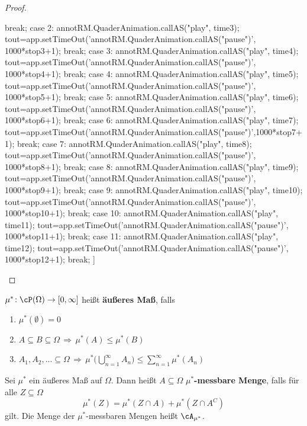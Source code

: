 \begin{proof}
\begin{center}
{{				break;
				case 2:
				annotRM.QuaderAnimation.callAS("play", time3);
				tout=app.setTimeOut('annotRM.QuaderAnimation.callAS("pause")', 1000*stop3+1);
				break;
				case 3:
				annotRM.QuaderAnimation.callAS("play", time4);
				tout=app.setTimeOut('annotRM.QuaderAnimation.callAS("pause")', 1000*stop4+1);
				break;
				case 4:
				annotRM.QuaderAnimation.callAS("play", time5);
				tout=app.setTimeOut('annotRM.QuaderAnimation.callAS("pause")', 1000*stop5+1);
				break;
				case 5:
				annotRM.QuaderAnimation.callAS("play", time6);
				tout=app.setTimeOut('annotRM.QuaderAnimation.callAS("pause")', 1000*stop6+1);
				break;
				case 6:
				annotRM.QuaderAnimation.callAS("play", time7);
				tout=app.setTimeOut('annotRM.QuaderAnimation.callAS("pause")',1000*stop7+1);
				break;
				case 7:
				annotRM.QuaderAnimation.callAS("play", time8);
				tout=app.setTimeOut('annotRM.QuaderAnimation.callAS("pause")', 1000*stop8+1);
				break;
				case 8:
				annotRM.QuaderAnimation.callAS("play", time9);
				tout=app.setTimeOut('annotRM.QuaderAnimation.callAS("pause")', 1000*stop9+1);
				break;
				case 9:
				annotRM.QuaderAnimation.callAS("play", time10);
				tout=app.setTimeOut('annotRM.QuaderAnimation.callAS("pause")', 1000*stop10+1);
				break;
				case 10:
				annotRM.QuaderAnimation.callAS("play", time11);
				tout=app.setTimeOut('annotRM.QuaderAnimation.callAS("pause")', 1000*stop11+1);
				break;
				case 11:
				annotRM.QuaderAnimation.callAS("play", time12);
				tout=app.setTimeOut('annotRM.QuaderAnimation.callAS("pause")', 1000*stop12+1);
				break;
		}}]{\fbox{\faStepForward
		}}
	\end{center}	

\end{proof}
\newpage
\begin{deff}
	$\mu^{*} \! : \cP (\Omega) \rightarrow [0,\infty]$ heißt \textbf{äußeres Maß}, falls
	\begin{enumerate}[label=(\roman*)]
		\item $\mu^{*}(\emptyset) = 0$
		\item $A \subseteq B \subseteq \Omega\, \Rightarrow \, \mu^{*}(A) \leq \mu^{*}(B)$
		\item $A_1,A_2,... \subseteq \Omega \, \Rightarrow \, \mu^{*} \Big(\bigcup\limits_{n=1}^{\infty} A_n \Big) \leq \sum\limits_{n=1}^{\infty} \mu^{*}(A_n)$
	\end{enumerate}
\end{deff}

\begin{deff}
	Sei $\mu^{*}$ ein äußeres Maß auf $\Omega$. Dann heißt $A \subseteq \Omega$ \textbf{$\mu^{*}$-messbare Menge}, falls für alle $Z \subseteq \Omega$ \[ \mu^{*}(Z) = \mu^{*}(Z\cap A) + \mu^{*}(Z \cap A^C) \] gilt. Die Menge der $\mu^{*}$-messbaren Mengen heißt $\cA_{\mu^{*}}$.
\end{deff}

